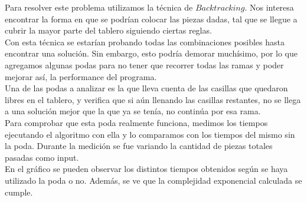 \documentclass[11pt, a4paper, twoside]{article}
\begin{document}
Para resolver este problema utilizamos la técnica de $Backtracking$. Nos interesa encontrar la forma en que se podrían
colocar las piezas dadas, tal que se llegue a cubrir la mayor parte del tablero siguiendo ciertas reglas. \\
Con esta técnica se estarían probando todas las combinaciones posibles hasta encontrar una solución. Sin embargo, 
esto podría demorar muchísimo, por lo que agregamos algunas podas para no tener que recorrer todas las ramas 
y poder mejorar así, la performance del programa. \\
Una de las podas a analizar es la que lleva cuenta de las casillas que quedaron libres en el tablero, y verifica 
que si aún llenando las casillas restantes, no se llega a una solución mejor que la que ya se tenía, no continúa
por esa rama. \\
Para comprobar que esta poda realmente funciona, medimos los tiempos ejecutando el algoritmo con ella y lo 
comparamos con los tiempos del mismo sin la poda. Durante la medición se fue variando la cantidad de 
piezas totales pasadas como input.  \\
En el gráfico se pueden observar los distintos tiempos obtenidos según se haya utilizado la poda o no. Además, 
se ve que la complejidad exponencial calculada se cumple. \\




\\



\end{document}
